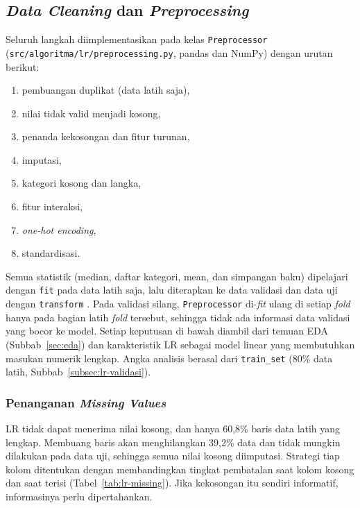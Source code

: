 \subsection{\textit{Data Cleaning} dan \textit{Preprocessing}}
\label{subsec:lr-preprocessing}

Seluruh langkah diimplementasikan pada kelas \texttt{Preprocessor} (\nolinkurl{src/algoritma/lr/preprocessing.py}, pandas dan NumPy) dengan urutan berikut:
\begin{enumerate}
	\item pembuangan duplikat (data latih saja),
	\item nilai tidak valid menjadi kosong,
	\item penanda kekosongan dan fitur turunan,
	\item imputasi,
	\item kategori kosong dan langka,
	\item fitur interaksi,
	\item \textit{one-hot encoding},
	\item standardisasi.
\end{enumerate}
Semua statistik (median, daftar kategori, mean, dan simpangan baku) dipelajari dengan \texttt{fit} pada data latih saja, lalu diterapkan ke data validasi dan data uji dengan \texttt{transform} \cite{slide-dataprep}. Pada validasi silang, \texttt{Preprocessor} di-\textit{fit} ulang di setiap \textit{fold} hanya pada bagian latih \textit{fold} tersebut, sehingga tidak ada informasi data validasi yang bocor ke model. Setiap keputusan di bawah diambil dari temuan EDA (Subbab~\ref{sec:eda}) dan karakteristik LR sebagai model linear yang membutuhkan masukan numerik lengkap. Angka analisis berasal dari \texttt{train\_set} (80\% data latih, Subbab~\ref{subsec:lr-validasi}).

\subsubsection{Penanganan \textit{Missing Values}}
LR tidak dapat menerima nilai kosong, dan hanya 60,8\% baris data latih yang lengkap. Membuang baris akan menghilangkan 39,2\% data dan tidak mungkin dilakukan pada data uji, sehingga semua nilai kosong diimputasi. Strategi tiap kolom ditentukan dengan membandingkan tingkat pembatalan saat kolom kosong dan saat terisi (Tabel~\ref{tab:lr-missing}). Jika kekosongan itu sendiri informatif, informasinya perlu dipertahankan.

